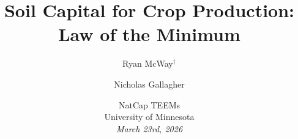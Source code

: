 \documentclass[xcolor = x11names, compress, aspectratio = 169]{beamer}
\renewcommand{\(}{\begin{columns}}
\renewcommand{\)}{\end{columns}}
\newcommand{\<}[1]{\begin{column}{#1}}
\renewcommand{\>}{\end{column}}
\begin{document}

\begin{frame}
    \title[Law of the Minimum]{
    Soil Capital for Crop Production: \\ Law of the Minimum}
    \author[McWay]{ 
        Ryan McWay$^\dagger$ \and 
        Nicholas Gallagher
    }
    \date{
    	NatCap TEEMs \\ 
    	\small{University of Minnesota} \\
    	\small{\textit{March 23rd, 2026}}
    }
    
    \titlepage
\end{frame}


\end{document}
